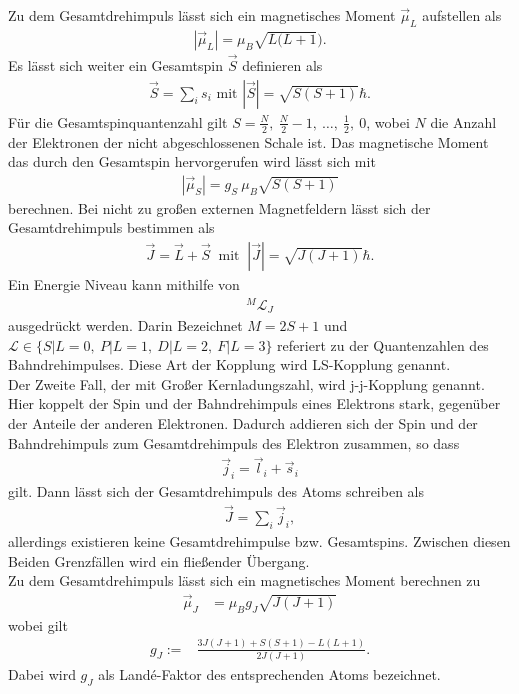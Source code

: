 Zu dem Gesamtdrehimpuls lässt sich ein magnetisches Moment $\vec{\mu}_L$ aufstellen als
\begin{align}
	|\vec{\mu}_L|=\mu_B\sqrt{L(L+1}).
\end{align}
Es lässt sich weiter ein Gesamtspin $\vec{S}$ definieren als
\begin{align}
	\vec{S}=\sum_is_i \text{ mit } |\vec{S}|=\sqrt{S(S+1)}\hbar.
\end{align}
Für die Gesamtspinquantenzahl gilt $S=\frac{N}{2},\ \frac{N}{2}-1 ,\ \dots,\ \frac{1}{2},\ 0$, wobei $N$ die Anzahl der Elektronen der nicht abgeschlossenen Schale ist.
Das magnetische Moment das durch den Gesamtspin hervorgerufen wird lässt sich mit
\begin{align}
	|\vec{\mu}_S|=g_S\ \mu_B\sqrt{S(S+1)}
\end{align}
berechnen.
Bei nicht zu großen externen Magnetfeldern lässt sich der Gesamtdrehimpuls bestimmen als
\begin{align}
	\vec{J}=\vec{L}+\vec{S} \ \text{ mit }\ |\vec{J}|=\sqrt{J(J+1)}\hbar.
\end{align}
Ein Energie Niveau kann mithilfe von 
\begin{align}
	{}^M\mathcal{L}_J
\end{align}
ausgedrückt werden.
Darin Bezeichnet $M=2S+1$ und $\mathcal{L}\in\{S|L=0,\ P|L=1,\ D|L=2,\ F|L=3\}$ referiert zu der Quantenzahlen des Bahndrehimpulses.
Diese Art der Kopplung wird LS-Kopplung genannt.\\
Der Zweite Fall, der mit Großer Kernladungszahl, wird j-j-Kopplung genannt.
Hier koppelt der Spin und der Bahndrehimpuls eines Elektrons stark, gegenüber der Anteile der anderen Elektronen.
Dadurch addieren sich der Spin und der Bahndrehimpuls zum Gesamtdrehimpuls des Elektron zusammen, so dass 
\begin{align}
	\vec{j}_i=\vec{l}_i+\vec{s}_i
\end{align}
gilt.
Dann lässt sich der Gesamtdrehimpuls des Atoms schreiben als
\begin{align}
	\vec{J}=\sum_i\vec{j}_i,
\end{align}
allerdings existieren keine Gesamtdrehimpulse bzw. Gesamtspins.
Zwischen diesen Beiden Grenzfällen wird ein fließender Übergang.\\
Zu dem Gesamtdrehimpuls lässt sich ein magnetisches Moment berechnen zu
\begin{align}
	\vec{\mu}_J&=\mu_Bg_J\sqrt{J(J+1)}
\end{align}
wobei gilt
\begin{align}
		g_J:=&\frac{3J(J+1)+S(S+1)-L(L+1)}{2J(J+1)}.
\end{align}
Dabei wird $g_J$ als Landé-Faktor des entsprechenden Atoms bezeichnet.
